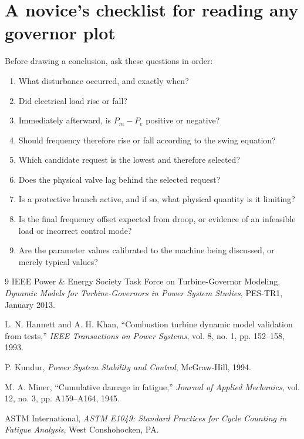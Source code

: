 \documentclass[11pt]{article}
\newcommand{\Pe}{\ensuremath{P_{e}}}
\newcommand{\Pm}{\ensuremath{P_{m}}}
\begin{document}
\section{A novice's checklist for reading any governor plot}
Before drawing a conclusion, ask these questions in order:
\begin{enumerate}
  \item What disturbance occurred, and exactly when?
  \item Did electrical load rise or fall?
  \item Immediately afterward, is $\Pm-\Pe$ positive or negative?
  \item Should frequency therefore rise or fall according to the swing
        equation?
  \item Which candidate request is the lowest and therefore selected?
  \item Does the physical valve lag behind the selected request?
  \item Is a protective branch active, and if so, what physical quantity is it
        limiting?
  \item Is the final frequency offset expected from droop, or evidence of an
        infeasible load or incorrect control mode?
  \item Are the parameter values calibrated to the machine being discussed, or
        merely typical values?
\end{enumerate}

{\small
\begin{thebibliography}{9}
IEEE Power \& Energy Society Task Force on Turbine-Governor Modeling,
\emph{Dynamic Models for Turbine-Governors in Power System Studies},
PES-TR1, January 2013.

L. N. Hannett and A. H. Khan,
``Combustion turbine dynamic model validation from tests,''
\emph{IEEE Transactions on Power Systems}, vol. 8, no. 1, pp. 152--158,
1993.

P. Kundur,
\emph{Power System Stability and Control},
McGraw-Hill, 1994.

M. A. Miner,
``Cumulative damage in fatigue,''
\emph{Journal of Applied Mechanics}, vol. 12, no. 3, pp. A159--A164,
1945.

ASTM International,
\emph{ASTM E1049: Standard Practices for Cycle Counting in Fatigue Analysis},
West Conshohocken, PA.
\end{thebibliography}
}
\end{document}
